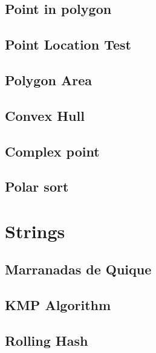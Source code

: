 \documentclass[10pt]{article}
\begin{document}
\begin{multicols*}{2}
\subsection{Point in polygon}

\subsection{Point Location Test}

\subsection{Polygon Area}

\subsection{Convex Hull}


\subsection{Complex point}


\subsection{Polar sort}


\section{Strings}

\subsection{Marranadas de Quique}


\subsection{KMP Algorithm}


\subsection{Rolling Hash}



\end{multicols*}
\end{document}
